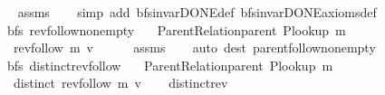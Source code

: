 \begin{isabellebody}
%
\isadelimproof
\ \ %
\endisadelimproof
%
\isatagproof
{}\isamarkupfalse%
\ assms\isanewline
\ \ \isamarkupfalse%
\ {\isacharparenleft}{\kern0pt}simp\ add{\isacharcolon}{\kern0pt}\ bfs{\isacharunderscore}{\kern0pt}invar{\isacharunderscore}{\kern0pt}DONE{\isacharunderscore}{\kern0pt}def\ bfs{\isacharunderscore}{\kern0pt}invar{\isacharunderscore}{\kern0pt}DONE{\isacharunderscore}{\kern0pt}axioms{\isacharunderscore}{\kern0pt}def{\isacharparenright}{\kern0pt}%
\endisatagproof
{\isafoldproof}%
%
\isadelimproof
\isanewline
%
\endisadelimproof
\isanewline
{}\isamarkupfalse%
\ {\isacharparenleft}{\kern0pt}\ bfs{\isacharparenright}{\kern0pt}\ rev{\isacharunderscore}{\kern0pt}follow{\isacharunderscore}{\kern0pt}non{\isacharunderscore}{\kern0pt}empty{\isacharcolon}{\kern0pt}\isanewline
\ \ \ {\isachardoublequoteopen}Parent{\isacharunderscore}{\kern0pt}Relation{\isachardot}{\kern0pt}parent\ {\isacharparenleft}{\kern0pt}P{\isacharunderscore}{\kern0pt}lookup\ m{\isacharparenright}{\kern0pt}{\isachardoublequoteclose}\isanewline
\ \ \ {\isachardoublequoteopen}rev{\isacharunderscore}{\kern0pt}follow\ m\ v\ {\isasymnoteq}\ {\isacharbrackleft}{\kern0pt}{\isacharbrackright}{\kern0pt}{\isachardoublequoteclose}\isanewline
%
\isadelimproof
\ \ %
\endisadelimproof
%
\isatagproof
{}\isamarkupfalse%
\ assms\isanewline
\ \ \isamarkupfalse%
\ {\isacharparenleft}{\kern0pt}auto\ dest{\isacharcolon}{\kern0pt}\ parent{\isachardot}{\kern0pt}follow{\isacharunderscore}{\kern0pt}non{\isacharunderscore}{\kern0pt}empty{\isacharparenright}{\kern0pt}%
\endisatagproof
{\isafoldproof}%
%
\isadelimproof
\isanewline
%
\endisadelimproof
\isanewline
{}\isamarkupfalse%
\ {\isacharparenleft}{\kern0pt}\ bfs{\isacharparenright}{\kern0pt}\ distinct{\isacharunderscore}{\kern0pt}rev{\isacharunderscore}{\kern0pt}follow{\isacharcolon}{\kern0pt}\isanewline
\ \ \ {\isachardoublequoteopen}Parent{\isacharunderscore}{\kern0pt}Relation{\isachardot}{\kern0pt}parent\ {\isacharparenleft}{\kern0pt}P{\isacharunderscore}{\kern0pt}lookup\ m{\isacharparenright}{\kern0pt}{\isachardoublequoteclose}\isanewline
\ \ \ {\isachardoublequoteopen}distinct\ {\isacharparenleft}{\kern0pt}rev{\isacharunderscore}{\kern0pt}follow\ m\ v{\isacharparenright}{\kern0pt}{\isachardoublequoteclose}\isanewline
%
\isadelimproof
\ \ %
\endisadelimproof
%
\isatagproof
{}\isamarkupfalse%
\ distinct{\isacharunderscore}{\kern0pt}rev\isanewline

\end{isabellebody}
